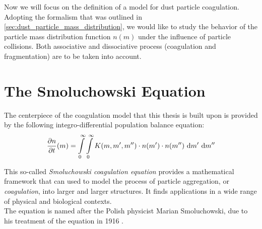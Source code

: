 Now we will focus on the definition of a model for dust particle coagulation. \\

Adopting the formalism that was outlined in \cref{sec:dust_particle_mass_distribution},
we would like to study the behavior of the particle mass distribution function $n(m)$
under the influence of particle collisions. Both associative and dissociative process 
(coagulation and fragmentation) are to be taken into account.


\section{The Smoluchowski Equation}

    The centerpiece of the coagulation model that this thesis is built upon is provided by 
    the following integro-differential population balance equation:
    \begin{equation}
        \label{eq:continuous_smoluchowski_equation}
        \frac{\partial n}{\partial t}(m)
            =
                \int\limits_0^\infty
                \int\limits_0^\infty
                K(m,m',m'')
                \cdot n(m')
                \cdot n(m'')
                \ \text{d} m'
                \ \text{d} m''
    \end{equation}

    This so-called \textit{Smoluchowski coagulation equation} provides a mathematical framework 
    that can used to model the process of particle aggregation, or \textit{coagulation}, 
    into larger and larger structures. It finds applications in a wide range of physical 
    and biological contexts. \\ %

    The equation is named after the Polish physicist Marian Smoluchowski, due to his treatment 
    of the equation in 1916 \cite{smoluchowski_1916}. \\

